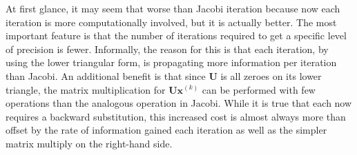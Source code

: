 At first glance, it may seem that worse than Jacobi iteration because now each iteration is more computationally involved, but it is actually better. The most important feature is that the number of iterations required to get a specific level of precision is fewer. Informally, the reason for this is that each iteration, by using the lower triangular form, is propagating more information per iteration than Jacobi. An additional benefit is that since $\mathbf{U}$ is all zeroes on its lower triangle, the matrix multiplication for $\mathbf{U} \mathbf{x}^{(k)}$ can be performed with few operations than the analogous operation in Jacobi. While it is true that each now requires a backward substitution, this increased cost is almost always more than offset by the rate of information gained each iteration as well as the simpler matrix multiply on the right-hand side.

